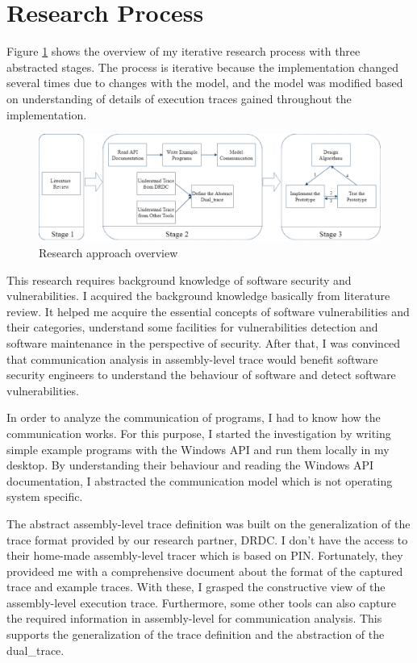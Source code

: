 \documentclass[12pt,oneside]{book}
\begin{document}
\section{Research Process}
Figure \ref{methodology} shows the overview of my iterative research process with three abstracted stages. The process is iterative because the implementation changed several times due to changes with the model, and the model was modified based on understanding of details of execution traces gained throughout the implementation. 

\begin{figure}[H]
  \centerline{\includegraphics[scale=0.44]{Figures/methodology}}
  \caption{Research approach overview}
  \label{methodology}
  \end{figure}

This research requires background knowledge of software security and vulnerabilities. I acquired the background knowledge basically from literature review. It helped me acquire the essential concepts of software vulnerabilities and their categories, understand some facilities for vulnerabilities detection and software maintenance in the perspective of security. After that, I was convinced that communication analysis in assembly-level trace would benefit software security engineers to understand the behaviour of software and detect software vulnerabilities. 

In order to analyze the communication of programs, I had to know how the communication works. For this purpose, I started the investigation by writing simple example programs with the Windows API and run them locally in my desktop. By understanding their behaviour and reading the Windows API documentation, I abstracted the communication model which is not operating system specific.

The abstract assembly-level trace definition was built on the generalization of the trace format provided by our research partner, DRDC. I don't have the access to their home-made assembly-level tracer which is based on PIN\cite{_pin_????}. Fortunately, they provideed me with a comprehensive document about the format of the captured trace and example traces. With these, I grasped the constructive view of the assembly-level execution trace. Furthermore, some other tools can also capture the required information in assembly-level for communication analysis. This supports the generalization of the trace definition and the abstraction of the dual\_trace.
\end{document}
